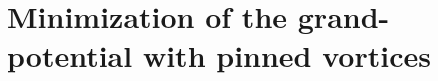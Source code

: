 \documentclass[a4paper, amsfonts, amssymb, amsmath, reprint, showkeys, nofootinbib, twoside,notitlepage,onecolumn]{revtex4-2}
\theoremstyle{definition}
\theoremstyle{theorem}
\theoremstyle{corollary}
\begin{document}
\appendix











\section{Minimization of the grand-potential with pinned vortices}\label{pinnezzo}
\end{document}
